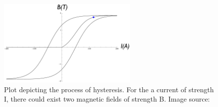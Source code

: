 \begin{figure}\begin{center}
\includegraphics[width=0.6\textwidth]{figures/calib/tag/ecor/hysteresis_keynote.eps}
\caption[Plot Depicting the Process of Hysteresis]{\label{fig:hyst}Plot depicting the process of hysteresis. For the a current of strength I, there could exist two magnetic fields of strength B. Image source:~\cite{clas.thesis.kunkel}}
\end{center}\end{figure}

\FloatBarrier


